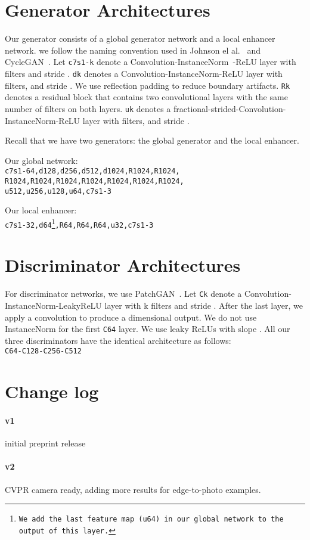 \documentclass[10pt,twocolumn,letterpaper]{article}
\begin{document}
\section{Generator Architectures}
Our generator consists of a global generator network and a local enhancer network. we follow the naming convention used in Johnson el al.~\cite{johnson2016perceptual} and CycleGAN~\cite{zhu2017unpaired}. Let \texttt{c7s1-k} denote a  Convolution-InstanceNorm~\cite{ulyanov2016instance}-ReLU layer with  filters and stride . \texttt{dk} denotes a  Convolution-InstanceNorm-ReLU layer with  filters, and stride . We use reflection padding  to reduce boundary artifacts. \texttt{Rk} denotes a residual block that contains two  convolutional layers with the same number of filters on both layers. \texttt{uk} denotes a  fractional-strided-Convolution-InstanceNorm-ReLU layer with  filters, and stride .

Recall that we have two generators: the global generator and the local enhancer.  

Our global network:\\
\texttt{c7s1-64,d128,d256,d512,d1024,R1024,R1024,\\
R1024,R1024,R1024,R1024,R1024,R1024,R1024,\\
u512,u256,u128,u64,c7s1-3}

Our local enhancer:\\
\texttt{c7s1-32,d64\footnote{We add the last feature map (\texttt{u64}) in our global network to the output of this layer.},R64,R64,R64,u32,c7s1-3}

\section{Discriminator Architectures}
For discriminator networks, we use  PatchGAN~\cite{isola2016image}. 
Let \texttt{Ck} denote a  Convolution-InstanceNorm-LeakyReLU layer with k filters and stride . After the last layer, we apply a convolution to produce a  dimensional output. We do not use InstanceNorm for the first \texttt{C64} layer. We use leaky ReLUs with slope . All our three discriminators have the identical architecture as follows:\\

\texttt{C64-C128-C256-C512}

\section{Change log}
\paragraph{v1} initial preprint release
\paragraph{v2} CVPR camera ready, adding more results for edge-to-photo examples. 
\end{document}
